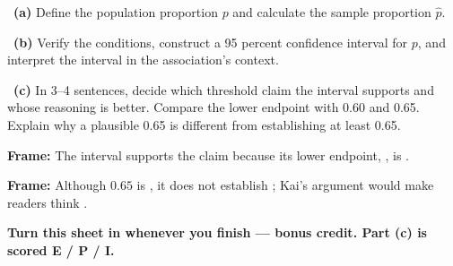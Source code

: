 \documentclass[11pt]{article}
\begin{document}
~\textbf{(a)} Define the population proportion $p$ and calculate the sample proportion $\hat p$.\par
\workspace{0.7in}

~\textbf{(b)} Verify the conditions, construct a 95 percent confidence interval for $p$, and interpret the interval in the association's context.\par
\workspace{1.4in}

~\textbf{(c)} In 3--4 sentences, decide which threshold claim the interval supports and whose reasoning is better. Compare the lower endpoint with 0.60 and 0.65. Explain why a plausible 0.65 is different from establishing at least 0.65.\par
\workspace{2.0in}

\begin{sentenceframebox}\raggedright\textbf{Frame:} The interval supports the claim \blank[1.7in] because its lower endpoint, \blank[0.7in], is \blank[1.4in].\end{sentenceframebox}

\begin{sentenceframebox}\raggedright\textbf{Frame:} Although $0.65$ is \blank[1.2in], it does not establish \blank[2.0in]; Kai's argument would make readers think \blank[2.2in].\end{sentenceframebox}

\textbf{Turn this sheet in whenever you finish --- bonus credit. Part (c) is scored E / P / I.}\par
\end{document}
